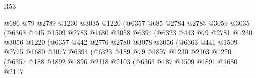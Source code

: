 \begin{lexlean}{R53}
\begin{coremodule}
                                @686
                                @79
                                @2789
                                @1230
                                @3035
                                @1220
                                (@6357
                                  @685
                                  @2784
                                  @2788
                                  @3059
                                  @3035
                                  (@6363
                                    @445
                                    @1509
                                    @2783
                                    @1680
                                    @3058
                                    @6394
                                    (@6323
                                      @443
                                      @79
                                      @2781
                                      @1230
                                      @3056
                                      @1220
                                      (@6357
                                        @442
                                        @2776
                                        @2780
                                        @3078
                                        @3056
                                        (@6363
                                          @441
                                          @1509
                                          @2775
                                          @1680
                                          @3077
                                          @6394
                                          (@6323
                                            @189
                                            @79
                                            @1897
                                            @1230
                                            @2103
                                            @1220
                                            (@6357
                                              @188
                                              @1892
                                              @1896
                                              @2118
                                              @2103
                                              (@6363
                                                @187
                                                @1509
                                                @1891
                                                @1680
                                                @2117

\end{coremodule}
\end{lexlean}
